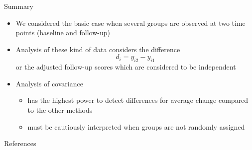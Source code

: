 \documentclass{beamer}
\begin{document}
\begin{frame}{Summary}
\begin{itemize}
  \item We considered the basic case when several groups are observed at
    two time points (baseline and follow-up)
  \item Analysis of these kind of data considers the difference
    \[
        d_i = y_{i2} - y_{i1}
    \]
    or the adjusted follow-up scores which are considered to be independent
  \item Analysis of covariance
  \begin{itemize}
    \item has the highest power to detect differences for average change
      compared to the other methods
    \item must be cautiously interpreted when groups are not randomly
      assigned
  \end{itemize}
\end{itemize}
\end{frame}


% 
% 
% 

\appendix
\begin{frame}{References}


\vfill
\end{frame}
\end{document}
